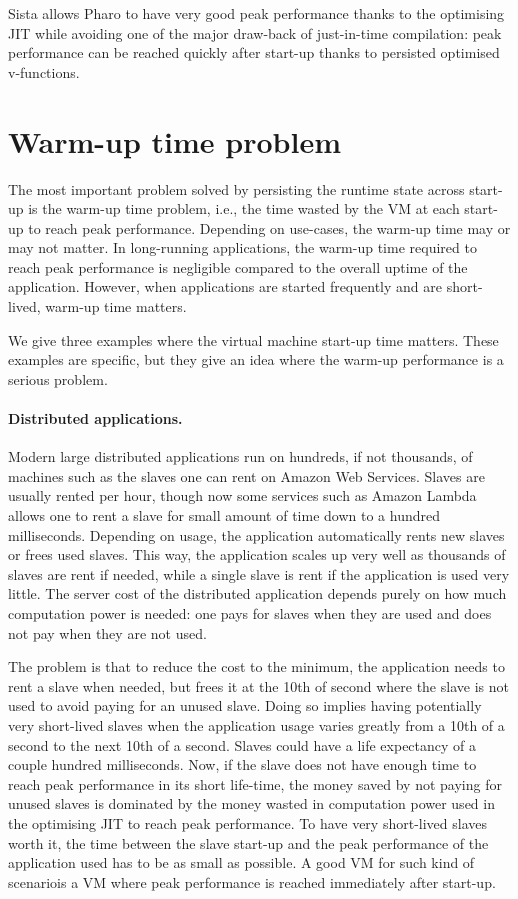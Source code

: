 \documentclass[a4paper,12pt,twoside]{../includes/ThesisStyle}
\begin{document}
Sista allows Pharo to have very good peak performance thanks to the optimising JIT while avoiding one of the major draw-back of just-in-time compilation: peak performance can be reached quickly after start-up thanks to persisted optimised v-functions.

\section{Warm-up time problem}
\label{sec:warmup}

The most important problem solved by persisting the runtime state across start-up is the warm-up time problem, i.e., the time wasted by the VM at each start-up to reach peak performance. Depending on use-cases, the warm-up time may or may not matter. In long-running applications, the warm-up time required to reach peak performance is negligible compared to the overall uptime of the application. However, when applications are started frequently and are short-lived, warm-up time matters.

We give three examples where the virtual machine start-up time matters. These examples are specific, but they give an idea where the warm-up performance is a serious problem.

\paragraph{Distributed applications.}
Modern large distributed applications run on hundreds, if not thousands, of machines such as the slaves one can rent on Amazon Web Services. Slaves are usually rented per hour, though now some services such as Amazon Lambda allows one to rent a slave for small amount of time down to a hundred milliseconds. Depending on usage, the application automatically rents new slaves or frees used slaves. This way, the application scales up very well as thousands of slaves are rent if needed, while a single slave is rent if the application is used very little. The server cost of the distributed application depends purely on how much computation power is needed: one pays for slaves when they are used and does not pay when they are not used.

The problem is that to reduce the cost to the minimum, the application needs to rent a slave when needed, but frees it at the 10th of second where the slave is not used to avoid paying for an unused slave. Doing so implies having potentially very short-lived slaves when the application usage varies greatly from a 10th of a second to the next 10th of a second. Slaves could have a life expectancy of a couple hundred milliseconds. Now, if the slave does not have enough time to reach peak performance in its short life-time, the money saved by not paying for unused slaves is dominated by the money wasted in computation power used in the optimising JIT to reach peak performance. To have very short-lived slaves worth it, the time between the slave start-up and the peak performance of the application used has to be as small as possible. A good VM for such kind of scenariois a VM where peak performance is reached immediately after start-up.
\end{document}
